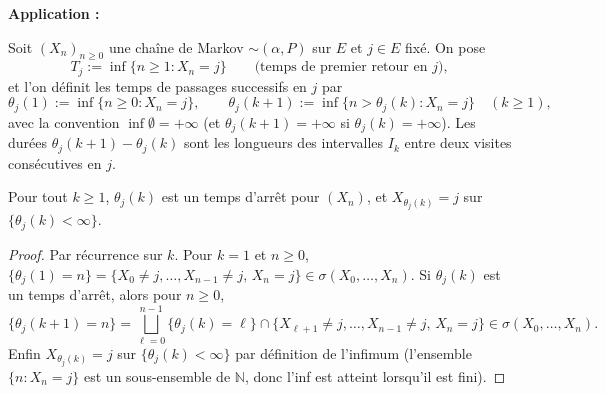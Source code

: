 \textbf{Application : }

Soit $(X_n)_{n\ge 0}$ une chaîne de Markov $\sim(\alpha,P)$ sur $E$ et $j\in E$ fixé. On pose
\[
T_j:=\inf\{n\ge 1 : X_n=j\}
\qquad\text{(temps de premier retour en } j\text{)},
\]
et l'on définit les temps de passages successifs en $j$ par
\[
\theta_j(1):=\inf\{n\ge 0 : X_n=j\},
\qquad
\theta_j(k+1):=\inf\{n>\theta_j(k) : X_n=j\}\quad(k\ge 1),
\]
avec la convention $\inf\emptyset=+\infty$ (et $\theta_j(k+1)=+\infty$ si $\theta_j(k)=+\infty$).
Les durées $\theta_j(k+1)-\theta_j(k)$ sont les longueurs des intervalles $I_k$ entre deux visites consécutives en $j$.

\begin{center}
\end{center}

\begin{lemme}
Pour tout $k\ge 1$, $\theta_j(k)$ est un temps d'arrêt pour $(X_n)$, et $X_{\theta_j(k)}=j$ sur $\{\theta_j(k)<\infty\}$.
\end{lemme}

\begin{proof}
Par récurrence sur $k$. Pour $k=1$ et $n\ge 0$,
$\{\theta_j(1)=n\}=\{X_0\ne j,\dots,X_{n-1}\ne j,\,X_n=j\}\in\sigma(X_0,\dots,X_n)$.
Si $\theta_j(k)$ est un temps d'arrêt, alors pour $n\ge 0$,
\[
\{\theta_j(k+1)=n\}=\bigsqcup_{\ell=0}^{n-1}\{\theta_j(k)=\ell\}\cap\{X_{\ell+1}\ne j,\dots,X_{n-1}\ne j,\,X_n=j\}
\in\sigma(X_0,\dots,X_n).
\]
Enfin $X_{\theta_j(k)}=j$ sur $\{\theta_j(k)<\infty\}$ par définition de l'infimum (l'ensemble $\{n:X_n=j\}$ est un sous-ensemble de $\mathbb N$, donc l'inf est atteint lorsqu'il est fini).
\end{proof}

